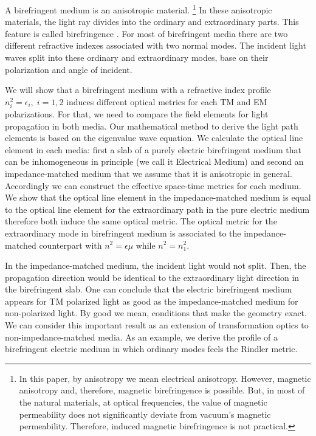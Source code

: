 \documentclass[9pt,twocolumn,twoside]{osajnl}
\begin{document}
A birefringent medium is an anisotropic material. \footnote{In this paper, by anisotropy we mean electrical anisotropy. However, magnetic anisotropy and, therefore, magnetic birefringence is possible. But, in most of the natural materials, at optical frequencies, the value of magnetic permeability does not significantly deviate from vacuum's magnetic permeability. Therefore, induced magnetic birefringence is not practical.}
In these anisotropic materials, the light ray divides into the ordinary and extraordinary parts. This feature is called birefringence \cite{saleh1991fundamentals, born1999principles, yariv1984optical}. 
For most of birefringent media there are two different refractive indexes associated with two normal modes. The incident light waves split into these ordinary and extraordinary modes, base on their polarization and angle of incident. 


We will show that a birefringent medium with a  refractive index profile $n^2_i= \epsilon_i , \; i=1,2$  induces different optical metrics for each TM and EM polarizations.  
For that, we need to compare the field elements for light propagation in both media. Our mathematical method to derive the light path elements is based on the eigenvalue wave equation. We calculate the optical line element in each media: first a slab of a purely electric birefringent medium that can be inhomogeneous in principle (we call it Electrical Medium) and second an impedance-matched medium that we assume that it is anisotropic in general. 
Accordingly we can construct the effective space-time metrics for each medium.
We show that the optical line element in the impedance-matched medium is equal to the optical line element for the extraordinary path in the pure electric medium therefore both induce the same optical metric.
The optical metric for the extraordinary mode in birefringent medium is associated to  the impedance-matched counterpart with $n^2= \epsilon \mu$ while $n^2=n^2_1$. 


In the impedance-matched medium, the incident light would not split. Then, the propagation direction would be identical to the extraordinary light direction in the birefringent slab. 
One can conclude that the electric birefringent medium appears for TM polarized light as good as the impedance-matched medium for non-polarized light.  By good we mean, conditions that make the geometry exact. We can consider this important result as an extension of transformation optics to non-impedance-matched media.
 As an example, we derive the profile of a birefringent electric medium in which ordinary modes feels the Rindler metric.
\end{document}
